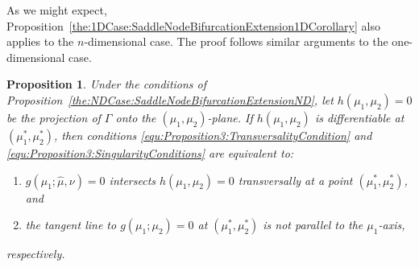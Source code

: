 \documentclass[12pt]{article}
\newtheorem{proposition}{Proposition}
\begin{document}
As we might expect, Proposition~\ref{the:1DCase:SaddleNodeBifurcationExtension1DCorollary} also applies to the $n$-dimensional case. The proof follows similar arguments to the one-dimensional case.

\begin{proposition}
    \label{the:NDCase:SaddleNodeBifurcationExtensionNDCorollary}
    Under the conditions of Proposition~\eqref{the:NDCase:SaddleNodeBifurcationExtensionND}, let $h(\mu_{1},\mu_{2})=0$ be the projection of $\Gamma$ onto the $(\mu_{1},\mu_{2})$-plane. If $h(\mu_{1},\mu_{2})$ is diffe\-rentiable at $(\mu_{1}^{*},\mu_{2}^{*})$, then conditions \eqref{equ:Proposition3:TransversalityCondition} and  \eqref{equ:Proposition3:SingularityConditions} are equivalent to:
    \begin{enumerate}
        \item $g(\mu_{1};\hat\mu,\nu)=0$ intersects $h(\mu_{1},\mu_{2})=0$ transversally at a point $(\mu_{1}^{*},\mu_{2}^{*})$, and
        \item the tangent line to $g(\mu_{1};\mu_{2})=0$ at $(\mu_{1}^{*},\mu_{2}^{*})$ is not parallel to the $\mu_{1}$-axis,
    \end{enumerate}
    respectively.
\end{proposition}
\end{document}
